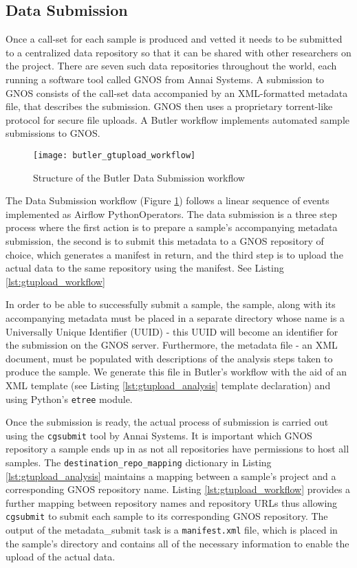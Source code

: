 \subsection {Data Submission}

Once a call-set for each sample is produced and vetted it needs to be submitted to a centralized data repository so that it can be shared with other researchers on the project. There are seven such data repositories throughout the world, each running a software tool called GNOS\autocite{wilks2014cancer} from Annai Systems. A submission to GNOS consists of the call-set data accompanied by an XML-formatted metadata file, that describes the submission. GNOS then uses a proprietary torrent-like protocol for secure file uploads. A Butler workflow implements automated sample submissions to GNOS.

\begin{figure}[H]
\texttt{[image: butler\_gtupload\_workflow]}
\centering
\caption {Structure of the Butler Data Submission workflow}
\label{fig:butler_gtupload_workflow}
\end{figure}

The Data Submission workflow (Figure \ref{fig:butler_gtupload_workflow}) follows a linear sequence of events implemented as Airflow PythonOperators. The data submission is a three step process where the first action is to prepare a sample's accompanying metadata submission, the second is to submit this metadata to a GNOS repository of choice, which generates a manifest in return, and the third step is to upload the actual data to the same repository using the manifest. See Listing \ref{lst:gtupload_workflow}

In order to be able to successfully submit a sample, the sample, along with its accompanying metadata must be placed in a separate directory whose name is a Universally Unique Identifier (UUID) - this UUID will become an identifier for the submission on the GNOS server. Furthermore, the metadata file - an XML document, must be populated with descriptions of the analysis steps taken to produce the sample. We generate this file in Butler's workflow with the aid of an XML template (see Listing \ref{lst:gtupload_analysis} template declaration) and using Python's \texttt{etree} module.

Once the submission is ready, the actual process of submission is carried out using the \texttt{cgsubmit} tool by Annai Systems. It is important which GNOS repository a sample ends up in as not all repositories have permissions to host all samples. The \texttt{destination_repo_mapping} dictionary in Listing \ref{lst:gtupload_analysis} maintains a mapping between a sample's project and a corresponding GNOS repository name. Listing \ref{lst:gtupload_workflow} provides a further mapping between repository names and repository URLs thus allowing \texttt{cgsubmit} to submit each sample to its corresponding GNOS repository. The output of the metadata\_submit task is a \texttt{manifest.xml} file, which is placed in the sample's directory and contains all of the necessary information to enable the upload of the actual data.

